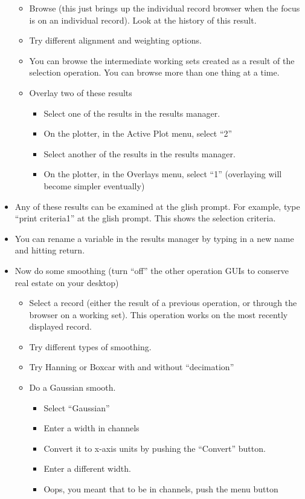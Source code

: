 \begin{itemize}
\begin{itemize}
\item Browse (this just brings up the individual record browser when the focus
is on an individual record).  Look at the history of this result.
\item Try different alignment and weighting options.
\item You can browse the intermediate working sets created as a result of
the selection operation.  You can browse more than one thing at a time.
\item Overlay two of these results
\begin{itemize}
\item Select one of the results in the results manager.
\item On the plotter, in the Active Plot menu, select ``2''
\item Select another of the results in the results manager.
\item On the plotter, in the Overlays menu, select ``1'' 
(overlaying will become simpler eventually)
\end{itemize}
\end{itemize}
\item Any of these results can be examined at the glish prompt.
For example, type ``print criteria1'' at the glish prompt.  This shows
the selection criteria.
\item You can rename a variable in the results manager by typing in a
new name and hitting return.
\item Now do some smoothing (turn ``off'' the other operation GUIs to
conserve real estate on your desktop)
\begin{itemize}
\item Select a record (either the result of a previous operation, or
through the browser on a working set).  This operation works on the
most recently displayed record.
\item Try different types of smoothing.
\item Try Hanning or Boxcar with and without ``decimation''
\item Do a Gaussian smooth.
\begin{itemize}
\item Select ``Gaussian''
\item Enter a width in channels
\item Convert it to x-axis units by pushing the ``Convert'' button.
\item Enter a different width.
\item Oops, you meant that to be in channels, push the menu button

\end{itemize}
\end{itemize}
\end{itemize}

